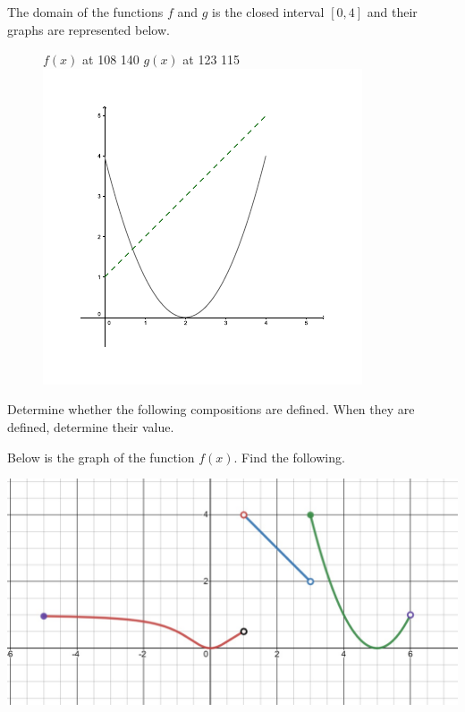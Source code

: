 \documentclass[11pt, addpoints]{exam}
\begin{document}
\begin{questions}

\question The domain of the functions $f$ and $g$ is the closed interval $[0,4]$ and their graphs are represented below.
\begin{figure}[h!]
	\small
	\pinlabel $f(x)$ at 108 140
	\pinlabel $g(x)$ at 123 115
	\endlabellist
	\includegraphics[width=0.6
\textwidth]{1-3-01}
\end{figure}

Determine whether the following compositions are defined. When they are defined, determine their value.
\addpoints


\pagebreak
         
\question Below is the graph of the function $f(x)$. Find the following.
\vspace{0.25in}
\begin{center}
\includegraphics[scale=0.3]{Images/Sum23M241_MT1_pic1.jpeg}
\end{center}
\addpoints
\begin{parts}

\end{parts}
\end{questions}
\end{document}
